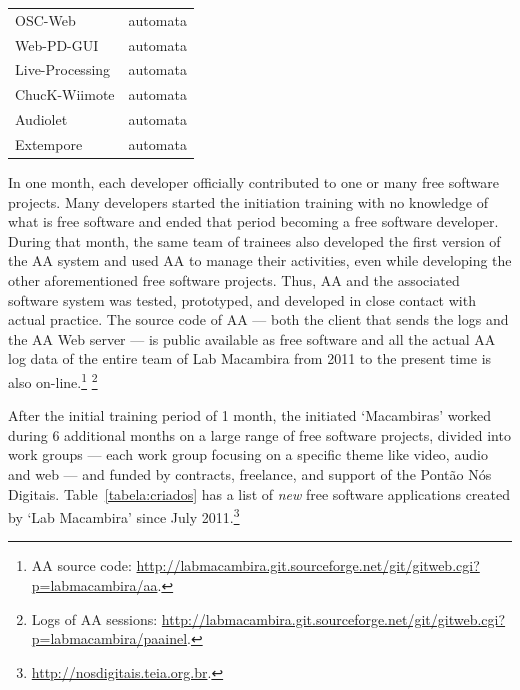 \documentclass{article}
\begin{document}
\begin{table}
\begin{center}
\begin{tabular}{|l|l|}
        OSC-Web               & automata                            \\
        Web-PD-GUI            & automata                            \\
        Live-Processing       & automata                            \\
        ChucK-Wiimote         & automata                            \\
        Audiolet              & automata                            \\
        Extempore             & automata                            \\
        \hline
    \end{tabular}
    \end{center}
    \label{tabela:contribuicoes}
\end{table}

In one month, each developer officially contributed to one or many free software
projects. Many developers started the initiation training with no knowledge of what
is free software and ended that period becoming a free software developer.
During that month, the same team of trainees also developed the first version of the AA
system and used AA to manage their activities, even while developing
the other aforementioned free software projects. Thus, AA and the associated
software system was tested, prototyped, and developed in close contact with
actual practice.  The source code of AA --- both the client that sends the
logs and the AA Web server --- is public available as free software and all the actual AA log data of the entire team of Lab Macambira from 2011 to
the present time is also on-line.\footnote{AA source
  code:
  \url{http://labmacambira.git.sourceforge.net/git/gitweb.cgi?p=labmacambira/aa}.} \footnote{Logs of AA sessions:
  \url{http://labmacambira.git.sourceforge.net/git/gitweb.cgi?p=labmacambira/paainel}.}

After the initial training period of 1 month, the initiated `Macambiras'
worked during 6 additional months on a large range of free software projects,
divided into work groups --- each work group focusing on a specific theme like
video, audio and web --- and funded by contracts, freelance, and support of the
Pont\~{a}o N\'{o}s Digitais.
Table~\ref{tabela:criados} has a list of \emph{new} free software applications
created by `Lab Macambira' since July 2011.\footnote{\url{http://nosdigitais.teia.org.br}.}
\end{document}
